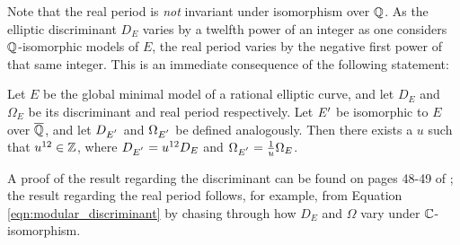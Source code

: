 Note that the real period is {\it not} invariant under isomorphism over $\mathbb{Q}$. As the elliptic discriminant $D_E$ varies by a twelfth power of an integer as one considers $\mathbb{Q}$-isomorphic models of $E$, the real period varies by the negative first power of that same integer. This is an immediate consequence of the following statement:
\begin{lemma}
Let $E$ be the global minimal model of a rational elliptic curve, and let $D_E$ and $\Omega_E$ be its discriminant and real period respectively. Let $E^{\prime}$ be isomorphic to $E$ over $\overline{\mathbb{Q}}$, and let $D_{E^{^{\prime}}}$ and $\Omega_{E^{^{\prime}}}$ be defined analogously. Then there exists a $u$ such that  $u^{12}\in \mathbb{Z}$, where $D_{E^{^{\prime}}}=u^{12} D_E$ and $\Omega_{E^{^{\prime}}}=\frac{1}{u}\Omega_E$.
\end{lemma}
A proof of the result regarding the discriminant can be found on pages 48-49 of \cite{Sil-1985}; the result regarding the real period follows, for example, from Equation \ref{eqn:modular_discriminant} by chasing through how $D_E$ and $\Omega$ vary under $\mathbb{C}$-isomorphism. \\

